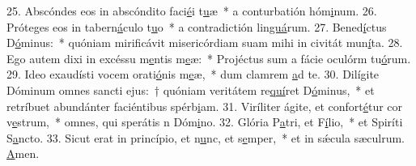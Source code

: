 25. Abscóndes eos in abscóndito faci\uline{é}i t\uline{u}æ~* a conturbatión hóm\uline{i}num.
26. Próteges eos in tabern\uline{á}culo t\uline{u}o~* a contradictión lin\uline{guá}rum.
27. Bened\uline{í}ctus D\uline{ó}minus:~* quóniam mirificávit misericórdiam suam mihi in civitát mun\uline{í}ta.
28. Ego autem dixi in excéssu m\uline{e}ntis m\uline{e}æ:~* Projéctus sum a fácie oculórm tu\uline{ó}rum.
29. Ideo exaudísti vocem orati\uline{ó}nis m\uline{e}æ,~* dum clamrem \uline{a}d te.
30. Dilígite Dóminum omnes sancti ejus:~† quóniam veritátem re\uline{quí}ret D\uline{ó}minus,~* et retríbuet abundánter faciéntibus spérb\uline{i}am.
31. Viríliter ágite, et confort\uline{é}tur cor v\uline{e}strum,~* omnes, qui sperátis n Dóm\uline{i}no.
32. Glória P\uline{a}tri, et F\uline{í}lio,~* et Spiríti S\uline{a}ncto.
33. Sicut erat in princípio, et n\uline{u}nc, et s\uline{e}mper,~* et in sǽcula sæculrum. \uline{A}men.
